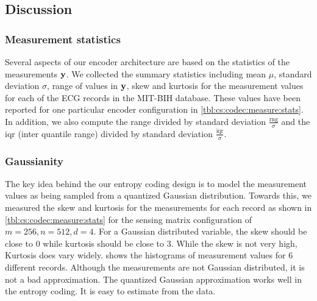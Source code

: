 \subsection{Discussion}

\subsubsection{Measurement statistics}
Several aspects of our encoder architecture are based on the
statistics of the measurements $\mathbf{y}$. We collected the summary
statistics including mean $\mu$, standard deviation $\sigma$,
range of values in $\mathbf{y}$, skew and kurtosis
for the measurement values for each
of the ECG records in the MIT-BIH database. These values
have been reported for one particular encoder configuration
in \cref{tbl:cs:codec:measure:stats}.
In addition, we also compute the range divided by standard deviation
$\frac{\text{rng}}{\sigma}$
and the iqr (inter quantile range) divided by standard deviation
$\frac{\text{iqr}}{\sigma}$.


\subsubsection{Gaussianity}

The key idea behind the our entropy coding
design is to model the measurement values as
being sampled from a quantized
Gaussian distribution. Towards this, we measured the
skew and kurtosis for the measurements for each record
as shown in \cref{tbl:cs:codec:measure:stats}
for the sensing matrix configuration of $m=256,n=512,d=4$.
For a Gaussian distributed variable,
the skew should be close to $0$ while kurtosis should be close to $3$.
While the skew is not very high, Kurtosis does vary widely.
 shows the histograms of measurement
values for 6 different records. Although the measurements are not
Gaussian distributed, it is not a bad approximation.
The quantized Gaussian approximation works well in the entropy
coding. It is easy to estimate from the data.

